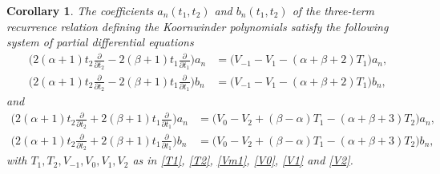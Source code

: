 \documentclass[10pt, reqno]{amsart}
\numberwithin{equation}{section}
\newtheorem{corollary}{Corollary}[section]
\numberwithin{equation}{section}
\begin{document}
\begin{corollary} \label{corollary} 
The coefficients $a_n(t_1,t_2)$ and $b_n(t_1,t_2)$ of the three-term recurrence relation defining the Koornwinder polynomials satisfy the following system of partial differential equations
\begin{align}
\Big(2(\alpha+1)t_2\frac{\partial}{\partial t_2}-2(\beta+1)t_1\frac{\partial}{\partial t_1}\Big)a_n&=\Big(V_{-1}-V_1-(\alpha+\beta+2)T_1\Big)a_n,\label{KTVam}\\
\Big(2(\alpha+1)t_2\frac{\partial}{\partial t_2}-2(\beta+1)t_1\frac{\partial}{\partial t_1}\Big)b_n&=\Big(V_{-1}-V_1-(\alpha+\beta+2)T_1\Big)b_n,\label{KTVbm}
\end{align}
and
\begin{align}
\Big(2(\alpha+1)t_2\frac{\partial}{\partial t_2}+2(\beta+1)t_1\frac{\partial}{\partial t_1}\Big)a_n&=\Big(V_0-V_2+(\beta-\alpha)T_1
-(\alpha+\beta+3)T_2\Big)a_n,\label{KTVap}\\
\Big(2(\alpha+1)t_2\frac{\partial}{\partial t_2}+2(\beta+1)t_1\frac{\partial}{\partial t_1}\Big)b_n&=\Big(V_0-V_2+(\beta-\alpha)T_1
-(\alpha+\beta+3)T_2\Big)b_n,\label{KTVbp}
\end{align}
with $T_1, T_2, V_{-1}, V_0,V_1, V_2$ as in \eqref{T1}, \eqref{T2}, \eqref{Vm1}, \eqref{V0}, \eqref{V1} and \eqref{V2}.
\end{corollary}
\end{document}

